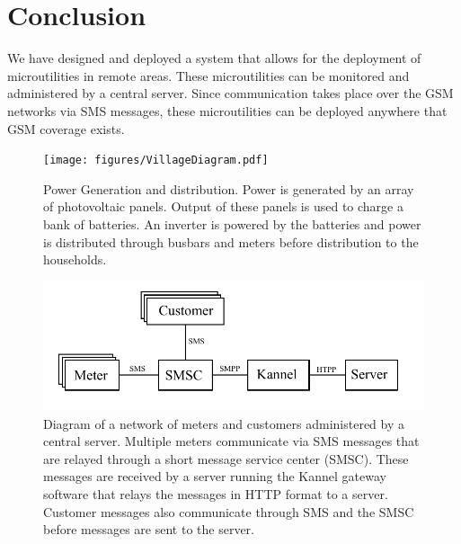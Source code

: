 \documentclass{sig-alternate}
\begin{document}
\section{Conclusion}
We have designed and deployed a system that allows for the deployment
of microutilities in remote areas.  These microutilities can be monitored
and administered by a central server.  Since communication takes place
over the GSM networks via SMS messages, these microutilities can be
deployed anywhere that GSM coverage exists.


\begin{figure}[]
\begin{center}
\texttt{[image: figures/VillageDiagram.pdf]}
\end{center}
\caption{Power Generation and distribution.
Power is generated by an array of photovoltaic panels.
Output of these panels is used to charge a bank of batteries.
An inverter is powered by the batteries and power is distributed
through busbars and meters before distribution to the households.}
\label{ShedWiringDiagram}
\end{figure}


\begin{figure}[]
\begin{center}
\includegraphics[width=\columnwidth]{figures/NetworkDiagram.pdf}
\end{center}
\caption{Diagram of a network of meters and customers administered by a central server.
Multiple meters communicate via SMS messages that are relayed through a short message
service center (SMSC).  These messages are received by a server running the Kannel gateway
software that relays the messages in HTTP format to a server.  Customer messages also
communicate through SMS and the SMSC before messages are sent to the server.}
\label{NetworkDiagram}
\end{figure}
\end{document}
